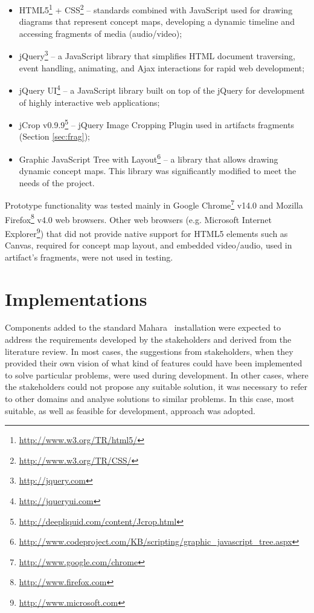 \begin{itemize}

\item HTML5\footnote{\url{http://www.w3.org/TR/html5/}} +
CSS\footnote{\url{http://www.w3.org/TR/CSS/}} -- standards combined with
JavaScript used for drawing diagrams that represent concept maps, developing a
dynamic timeline and accessing fragments of media (audio/video);

\item jQuery\footnote{\url{http://jquery.com}} -- a JavaScript library that
simplifies HTML document traversing, event handling, animating, and Ajax
interactions for rapid web development;

\item jQuery UI\footnote{\url{http://jqueryui.com}} -- a JavaScript library
built on top of the jQuery for development of highly interactive web applications;

\item jCrop v0.9.9\footnote{\url{http://deepliquid.com/content/Jcrop.html}}
-- jQuery Image Cropping Plugin used in artifacts fragments (Section
\ref{sec:frag});

\item Graphic JavaScript Tree with
Layout\footnote{\url{http://www.codeproject.com/KB/scripting/graphic_javascript_tree.aspx}}
-- a library that allows drawing dynamic concept maps. This library was
significantly modified to meet the needs of the project.
\end{itemize}

Prototype functionality was tested mainly in Google
Chrome\footnote{\url{http://www.google.com/chrome}} v14.0 and Mozilla
Firefox\footnote{\url{http://www.firefox.com}} v4.0 web browsers. Other web
browsers (e.g. Microsoft Internet
Explorer\footnote{\url{http://www.microsoft.com}}) that did not provide native
support for HTML5 elements such as Canvas, required for concept map layout, and
embedded video/audio, used in artifact's fragments, were not used in testing.

\section{Implementations}

Components added to the standard Mahara \ep~installation were expected to
address the requirements developed by the stakeholders and derived from the
literature review. In most cases, the suggestions from stakeholders, when they
provided their own vision of what kind of features could have been implemented
to solve particular problems, were used during development. In other cases,
where the stakeholders could not propose any suitable solution, it was necessary
to refer to other domains and analyse solutions to similar problems. In this
case, most suitable, as well as feasible for development, approach was adopted.

